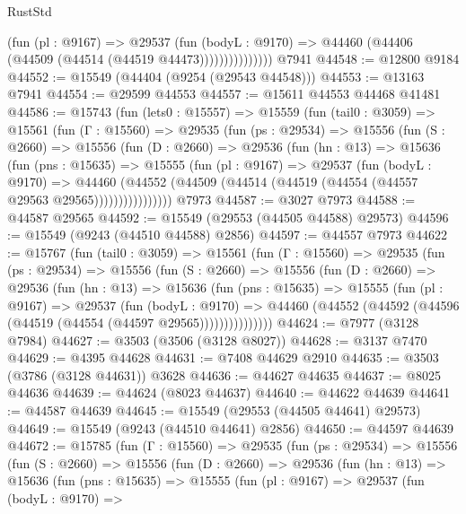 \begin{lexlean}{RustStd}
\begin{coremodule}
                      (fun (pl : @9167) =>
                      @29537
                        (fun (bodyL : @9170) =>
                        @44460 (@44406 (@44509 (@44514 (@44519 @44473)))))))))))))))
    @7941
@44548 := @12800 @9184
@44552 := @15549 (@44404 (@9254 (@29543 @44548)))
@44553 := @13163 @7941
@44554 := @29599 @44553
@44557 := @15611 @44553 @44468 @41481
@44586 := @15743
    (fun (lets0 : @15557) =>
    @15559
      (fun (tail0 : @3059) =>
      @15561
        (fun (Γ : @15560) =>
        @29535
          (fun (ps : @29534) =>
          @15556
            (fun (S : @2660) =>
            @15556
              (fun (D : @2660) =>
              @29536
                (fun (hn : @13) =>
                @15636
                  (fun (pns : @15635) =>
                  @15555
                    (fun (pl : @9167) =>
                    @29537
                      (fun (bodyL : @9170) =>
                      @44460
                        (@44552
                          (@44509 (@44514 (@44519 (@44554 (@44557 @29563 @29565))))))))))))))))
    @7973
@44587 := @3027 @7973
@44588 := @44587 @29565
@44592 := @15549 (@29553 (@44505 @44588) @29573)
@44596 := @15549 (@9243 (@44510 @44588) @2856)
@44597 := @44557 @7973
@44622 := @15767
    (fun (tail0 : @3059) =>
    @15561
      (fun (Γ : @15560) =>
      @29535
        (fun (ps : @29534) =>
        @15556
          (fun (S : @2660) =>
          @15556
            (fun (D : @2660) =>
            @29536
              (fun (hn : @13) =>
              @15636
                (fun (pns : @15635) =>
                @15555
                  (fun (pl : @9167) =>
                  @29537
                    (fun (bodyL : @9170) =>
                    @44460 (@44552 (@44592 (@44596 (@44519 (@44554 (@44597 @29565)))))))))))))))
@44624 := @7977 (@3128 @7984)
@44627 := @3503 (@3506 (@3128 @8027))
@44628 := @3137 @7470
@44629 := @4395 @44628
@44631 := @7408 @44629 @2910
@44635 := @3503 (@3786 (@3128 @44631)) @3628
@44636 := @44627 @44635
@44637 := @8025 @44636
@44639 := @44624 (@8023 @44637)
@44640 := @44622 @44639
@44641 := @44587 @44639
@44645 := @15549 (@29553 (@44505 @44641) @29573)
@44649 := @15549 (@9243 (@44510 @44641) @2856)
@44650 := @44597 @44639
@44672 := @15785
    (fun (Γ : @15560) =>
    @29535
      (fun (ps : @29534) =>
      @15556
        (fun (S : @2660) =>
        @15556
          (fun (D : @2660) =>
          @29536
            (fun (hn : @13) =>
            @15636
              (fun (pns : @15635) =>
              @15555
                (fun (pl : @9167) =>
                @29537
                  (fun (bodyL : @9170) =>

\end{coremodule}
\end{lexlean}
